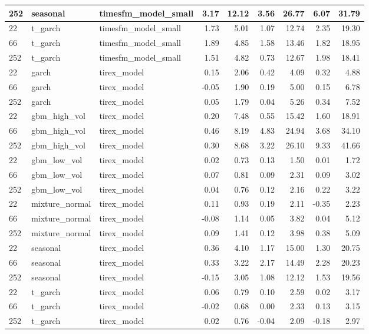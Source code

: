 {\begin{tabular}{lllrrrrrr}
252 & seasonal & timesfm\_model\_small & 3.17 & 12.12 & 3.56 & 26.77 & 6.07 & 31.79 \\
\midrule
22 & t\_garch & timesfm\_model\_small & 1.73 & 5.01 & 1.07 & 12.74 & 2.35 & 19.30 \\
66 & t\_garch & timesfm\_model\_small & 1.89 & 4.85 & 1.58 & 13.46 & 1.82 & 18.95 \\
252 & t\_garch & timesfm\_model\_small & 1.51 & 4.82 & 0.73 & 12.67 & 1.98 & 18.41 \\
\midrule
22 & garch & tirex\_model & 0.15 & 2.06 & 0.42 & 4.09 & 0.32 & 4.88 \\
66 & garch & tirex\_model & -0.05 & 1.90 & 0.19 & 5.00 & 0.15 & 6.78 \\
252 & garch & tirex\_model & 0.05 & 1.79 & 0.04 & 5.26 & 0.34 & 7.52 \\
\midrule
22 & gbm\_high\_vol & tirex\_model & 0.20 & 7.48 & 0.55 & 15.42 & 1.60 & 18.91 \\
66 & gbm\_high\_vol & tirex\_model & 0.46 & 8.19 & 4.83 & 24.94 & 3.68 & 34.10 \\
252 & gbm\_high\_vol & tirex\_model & 0.30 & 8.68 & 3.22 & 26.10 & 9.33 & 41.66 \\
\midrule
22 & gbm\_low\_vol & tirex\_model & 0.02 & 0.73 & 0.13 & 1.50 & 0.01 & 1.72 \\
66 & gbm\_low\_vol & tirex\_model & 0.07 & 0.81 & 0.09 & 2.31 & 0.09 & 3.02 \\
252 & gbm\_low\_vol & tirex\_model & 0.04 & 0.76 & 0.12 & 2.16 & 0.22 & 3.22 \\
\midrule
22 & mixture\_normal & tirex\_model & 0.11 & 0.93 & 0.19 & 2.11 & -0.35 & 2.23 \\
66 & mixture\_normal & tirex\_model & -0.08 & 1.14 & 0.05 & 3.82 & 0.04 & 5.12 \\
252 & mixture\_normal & tirex\_model & 0.09 & 1.41 & 0.12 & 3.98 & 0.38 & 5.09 \\
\midrule
22 & seasonal & tirex\_model & 0.36 & 4.10 & 1.17 & 15.00 & 1.30 & 20.75 \\
66 & seasonal & tirex\_model & 0.33 & 3.22 & 2.17 & 14.49 & 2.28 & 20.23 \\
252 & seasonal & tirex\_model & -0.15 & 3.05 & 1.08 & 12.12 & 1.53 & 19.56 \\
\midrule
22 & t\_garch & tirex\_model & 0.06 & 0.79 & 0.10 & 2.59 & 0.02 & 3.17 \\
66 & t\_garch & tirex\_model & -0.02 & 0.68 & 0.00 & 2.33 & 0.13 & 3.15 \\
252 & t\_garch & tirex\_model & 0.02 & 0.76 & -0.04 & 2.09 & -0.18 & 2.97 \\

\end{tabular}}
